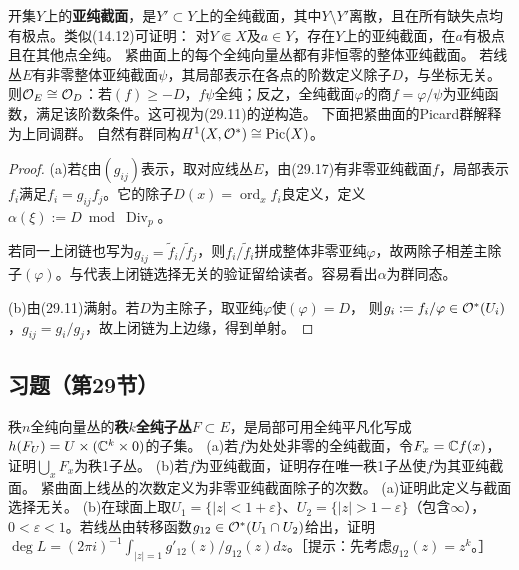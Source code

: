 开集$Y$上的\textbf{亚纯截面}，是$Y'\subset Y$上的全纯截面，其中$Y\setminus Y'$离散，且在所有缺失点均有极点。类似(14.12)可证明：
对$Y\Subset X$及$a\in Y$，存在$Y$上的亚纯截面，在$a$有极点且在其他点全纯。
紧曲面上的每个全纯向量丛都有非恒零的整体亚纯截面。
若线丛$E$有非零整体亚纯截面$\psi$，其局部表示在各点的阶数定义除子$D$，与坐标无关。则$\mathcal O_E\cong\mathcal O_D$：若$(f)\ge-D$，$f\psi$全纯；反之，全纯截面$\varphi$的商$f=\varphi/\psi$为亚纯函数，满足该阶数条件。这可视为(29.11)的逆构造。
下面把紧曲面的Picard群解释为上同调群。
自然有群同构$H^1(X,\mathcal O^*)\cong\operatorname{Pic}(X)$。
\begin{proof}
(a)若$\xi$由$(g_{ij})$表示，取对应线丛$E$，由(29.17)有非零亚纯截面$f$，局部表示$f_i$满足$f_i=g_{ij}f_j$。它的除子$D(x)=\operatorname{ord}_xf_i$良定义，定义$\alpha(\xi):=D\bmod\operatorname{Div}_p$。

若同一上闭链也写为$g_{ij}=\widetilde f_i/\widetilde f_j$，则$f_i/\widetilde f_i$拼成整体非零亚纯$\varphi$，故两除子相差主除子$(\varphi)$。与代表上闭链选择无关的验证留给读者。容易看出$\alpha$为群同态。

(b)由(29.11)满射。若$D$为主除子，取亚纯$\varphi$使$(\varphi)=D$，
则$g_i:=f_i/\varphi\in\mathcal O^*(U_i)$，$g_{ij}=g_i/g_j$，故上闭链为上边缘，得到单射。
\end{proof}
\subsection*{习题（第29节）}
秩$n$全纯向量丛的\textbf{秩$k$全纯子丛}$F\subset E$，是局部可用全纯平凡化写成$h(F_U)=U\times(\mathbb C^k\times0)$的子集。
(a)若$f$为处处非零的全纯截面，令$F_x=\mathbb C f(x)$，证明$\bigcup_xF_x$为秩1子丛。
(b)若$f$为亚纯截面，证明存在唯一秩1子丛使$f$为其亚纯截面。
紧曲面上线丛的次数定义为非零亚纯截面除子的次数。
(a)证明此定义与截面选择无关。
(b)在球面上取$U_1=\{|z|<1+\varepsilon\}$、$U_2=\{|z|>1-\varepsilon\}$（包含$\infty$），$0<\varepsilon<1$。若线丛由转移函数$g_{12}\in\mathcal O^*(U_1\cap U_2)$给出，证明$\deg L=(2\pi i)^{-1}\int_{|z|=1}g'_{12}(z)/g_{12}(z)dz$。［提示：先考虑$g_{12}(z)=z^k$。］
